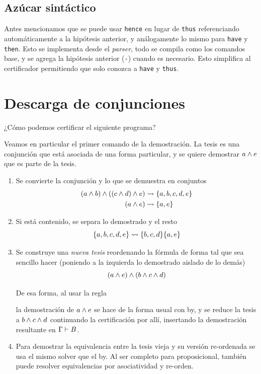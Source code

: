 \subsection{Azúcar sintáctico}

Antes mencionamos que se puede usar \lstinline{hence} en lugar de \lstinline{thus} referenciando automáticamente a la hipótesis anterior, y análogamente lo mismo para \lstinline{have} y \lstinline{then}. Esto se implementa desde el \textit{parser}, todo se compila como los comandos base, y se agrega la hipótesis anterior (\lstinline{-}) cuando es necesario. Esto simplifica al certificador permitiendo que solo conozca a \lstinline{have} y \lstinline{thus}.

\section{Descarga de conjunciones}

¿Cómo podemos certificar el siguiente programa?



Veamos en particular el primer comando de la demostración. La tesis es una conjunción que está asociada de una forma particular, y se quiere demostrar $a \wedge e$ que es parte de la tesis.

\begin{enumerate}
    \item Se convierte la conjunción y lo que se demuestra en conjuntos
    \begin{align*}
        (a \wedge b) \wedge ((c \wedge d) \wedge e)
        &\rightsquigarrow
        \{a, b, c, d, e\}\\
        (a \wedge e) &\rightsquigarrow \{a, e\}
    \end{align*}
    \item Si está contenido, se separa lo demostrado y el resto
    \[
        \{a, b, c, d, e\} \rightsquigarrow \{b, c, d\} \{a, e\}
    \]
    \item Se construye una \textit{nueva tesis} reordenando la fórmula de forma tal que sea sencillo hacer  (poniendo a la izquierda lo demostrado aislado de lo demás)
    \[
        (a \wedge e) \wedge (b \wedge c \wedge d)
    \]

    De esa forma, al usar la regla

    \proofTreeAndI

    la demostración de $a \wedge e$ se hace de la forma usual con by, y se reduce
    la tesis a $b \wedge c \wedge d$ continuando la certificación por allí,
    insertando la demostración resultante en $\Gamma \vdash B$.

    \item Para demostrar la equivalencia entre la tesis vieja y su versión re-ordenada se usa el mismo solver que el by. Al ser completo para proposicional, también puede resolver equivalencias por asociatividad y re-orden.
\end{enumerate}

